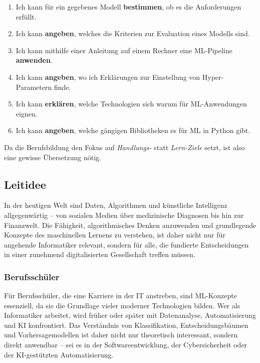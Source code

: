 \documentclass[twocolumn]{article}
\begin{document}
\begin{enumerate}[label=\arabic{mainnum}.\arabic*, nosep]

    \item Ich kann für ein gegebenes Modell \textbf{bestimmen}, ob es die Anforderungen erfüllt.
    \item Ich kann \textbf{angeben}, welches die Kriterien zur Evaluation eines Modells sind.


    \item Ich kann mithilfe einer Anleitung auf einem Rechner eine ML-Pipeline \textbf{anwenden}.
    \item Ich kann \textbf{angeben}, wo ich Erklärungen zur Einstellung von Hyper-Parametern finde.


    \item Ich kann \textbf{erklären}, welche Technologien sich warum für ML-Anwendungen eignen.
    \item Ich kann \textbf{angeben}, welche gängigen Bibliotheken es für ML in Python gibt.
    
\end{enumerate}


Da die Berufsbildung den Fokus auf \textit{Handlungs-} statt \textit{Lern-Ziele} setzt, ist also eine gewisse Übersetzung nötig.

\subsection{Leitidee}
In der heutigen Welt sind Daten, Algorithmen und künstliche Intelligenz allgegenwärtig – von sozialen Medien über medizinische Diagnosen bis hin zur Finanzwelt. Die Fähigkeit, algorithmisches Denken anzuwenden und grundlegende Konzepte des maschinellen Lernens zu verstehen, ist daher nicht nur für angehende Informatiker relevant, sondern für alle, die fundierte Entscheidungen in einer zunehmend digitalisierten Gesellschaft treffen müssen.

\subsubsection{Berufsschüler}

Für Berufsschüler, die eine Karriere in der IT anstreben, sind ML-Konzepte essenziell, da sie die Grundlage vieler moderner Technologien bilden. Wer als Informatiker arbeitet, wird früher oder später mit Datenanalyse, Automatisierung und KI konfrontiert. Das Verständnis von Klassifikation, Entscheidungsbäumen und Vorhersagemodellen ist daher nicht nur theoretisch interessant, sondern direkt anwendbar – sei es in der Softwareentwicklung, der Cybersicherheit oder der KI-gestützten Automatisierung.
\end{document}

